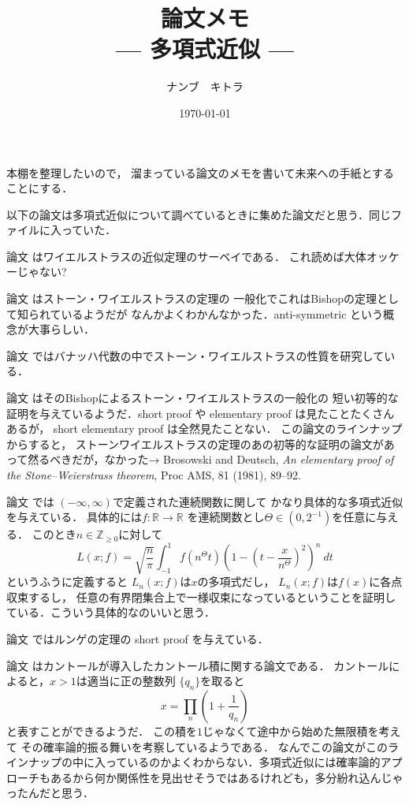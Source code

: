 \documentclass[leqno, a4paper, 12pt]{jsarticle}
\title{論文メモ
\large{\\--- 多項式近似 ---}
}
\author{ナンブ　キトラ}
\date{\today}
\newcommand{\zz}{\mathbb{Z}}
\newcommand{\rr}{\mathbb{R}}
\begin{document}
\maketitle

本棚を整理したいので，
溜まっている論文のメモを書いて未来への手紙とすることにする．

以下の論文は多項式近似について調べているときに集めた論文だと思う．同じファイルに入っていた．

論文
\cite{MR2587018}
はワイエルストラスの近似定理のサーベイである．
これ読めば大体オッケーじゃない?

論文
\cite{MR0133676}
はストーン・ワイエルストラスの定理の
一般化でこれはBishopの定理として知られているようだが
なんかよくわかんなかった．anti-symmetric という概念が大事らしい．

論文
\cite{MR0126738}
ではバナッハ代数の中でストーン・ワイエルストラスの性質を研究している．


論文
\cite{MR0757664}
はそのBishopによるストーン・ワイエルストラスの一般化の
短い初等的な証明を与えているようだ．short proof や
elementary proof は見たことたくさんあるが，
short elementary proof は全然見たことない．
この論文のラインナップからすると，
ストーンワイエルストラスの定理のあの初等的な証明の論文があって然るべきだが，なかった→
Brosowski and Deutsch, \textit{An elementary proof of 
the Stone--Weierstrass theorem}, Proc AMS, 81 (1981), 89--92.

論文
\cite{MR0109975}
では
$(-\infty, \infty)$で定義された連続関数に関して
かなり具体的な多項式近似を与えている．
具体的には$f\colon \rr\to \rr$
を連続関数とし$\Theta\in (0, 2^{-1})$を任意に与える．
このとき$n\in \zz_{\ge 0}$に対して
\[
L(x; f)=\sqrt{\frac{n}{\pi}}\int_{-1}^{1}f(n^{\Theta}t)
\left(1-\left(t-\frac{x}{n^{\Theta}}\right)^{2}\right)^{n}\ dt
\]
というふうに定義すると
$L_{n}(x; f)$は$x$の多項式だし，
$L_{n}(x; f)$は$f(x)$に各点収束するし，
任意の有界閉集合上で一様収束になっているということを証明している．こういう具体的なのいいと思う．


論文
\cite{MR0427639}
ではルンゲの定理の
short proof を与えている．

論文
\cite{MR0103874}
はカントールが導入したカントール積に関する論文である．
カントールによると，$x>1$は適当に正の整数列
$\{q_{n}\}$を取ると
\[
x=\prod_{n}\left(1+\frac{1}{q_{n}}\right)
\]
と表すことができるようだ．
この積を$1$じゃなくて途中から始めた無限積を考えて
その確率論的振る舞いを考察しているようである．
なんでこの論文がこのラインナップの中に入っているのかよくわからない．多項式近似には確率論的アプローチもあるから何か関係性を見出せそうではあるけれども，多分紛れ込んじゃったんだと思う．

\nocite{*}


\end{document}
